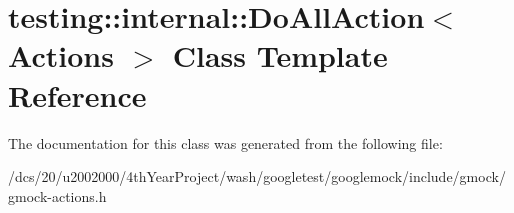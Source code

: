 \hypertarget{classtesting_1_1internal_1_1DoAllAction}{}\section{testing\+:\+:internal\+:\+:Do\+All\+Action$<$ Actions $>$ Class Template Reference}
\label{classtesting_1_1internal_1_1DoAllAction}


The documentation for this class was generated from the following file\+:\begin{DoxyCompactItemize}
\item 
/dcs/20/u2002000/4th\+Year\+Project/wash/googletest/googlemock/include/gmock/gmock-\/actions.\+h\end{DoxyCompactItemize}
